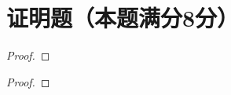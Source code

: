 \documentclass{USTBExam}
\begin{document}
\begin{problem}

\end{problem}

\begin{solution}

\end{solution}

\begin{problem}

\end{problem}

\begin{solution}

\end{solution}

\begin{problem}

\end{problem}

\begin{solution}

\end{solution}

\section{证明题（本题满分8分）}

\begin{problem}

\end{problem}

\begin{proof}

\end{proof}

\begin{problem}

\end{problem}

\begin{proof}

\end{proof}
\end{document}
